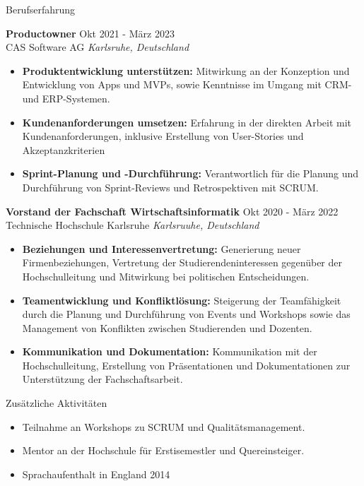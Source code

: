\documentclass{resume} %
\begin{document}

\begin{rSection}{Berufserfahrung}

    \textbf{Productowner} \hfill Okt 2021 - März 2023\\
    CAS Software AG \hfill \textit{Karlsruhe, Deutschland}
    \begin{itemize}
        \itemsep -3pt {}
        \item \raggedright{\textbf{Produktentwicklung unterstützen:} Mitwirkung an der Konzeption und Entwicklung von Apps und MVPs, sowie Kenntnisse im Umgang mit CRM- und ERP-Systemen.}
        \item \raggedright{\textbf{Kundenanforderungen umsetzen:} Erfahrung in der direkten Arbeit mit Kundenanforderungen, inklusive Erstellung von User-Stories und Akzeptanzkriterien}
        \item \raggedright{\textbf{Sprint-Planung und -Durchführung:} Verantwortlich für die Planung und Durchführung von Sprint-Reviews und Retrospektiven mit SCRUM.}
    \end{itemize}

    \textbf{Vorstand der Fachschaft Wirtschaftsinformatik} \hfill Okt 2020 - März 2022\\
    Technische Hochschule Karlsruhe \hfill \textit{Karlsruuhe, Deutschland}
    \begin{itemize}
        \itemsep -3pt {}
        \item \raggedright{\textbf{Beziehungen und Interessenvertretung:} Generierung neuer Firmenbeziehungen, Vertretung der Studierendeninteressen gegenüber der Hochschulleitung und Mitwirkung bei politischen Entscheidungen.}
        \item \raggedright{\textbf{Teamentwicklung und Konfliktlösung:} Steigerung der Teamfähigkeit durch die Planung und Durchführung von Events und Workshops sowie das Management von Konflikten zwischen Studierenden und Dozenten.} 
        \item \raggedright{\textbf{Kommunikation und Dokumentation:} Kommunikation mit der Hochschulleitung, Erstellung von Präsentationen und Dokumentationen zur Unterstützung der Fachschaftsarbeit.}
    \end{itemize}
\end{rSection}

\begin{rSection}{Zusätzliche Aktivitäten}
    \begin{itemize}
        \item 	Teilnahme an Workshops zu SCRUM und Qualitätsmanagement.
        \item	Mentor an der Hochschule für Erstisemestler und Quereinsteiger.
        \item   Sprachaufenthalt in England 2014
    \end{itemize}


\end{rSection}
\end{document}
